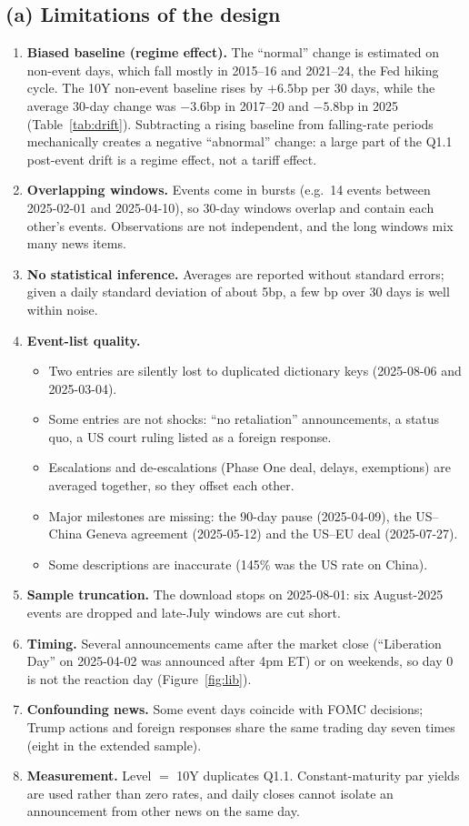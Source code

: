 \documentclass[11pt]{article}
\begin{document}
\subsection*{(a) Limitations of the design}
\begin{enumerate}[leftmargin=1.4em,itemsep=1pt]
\item \textbf{Biased baseline (regime effect).} The ``normal'' change is
estimated on non-event days, which fall mostly in 2015--16 and 2021--24, the
Fed hiking cycle. The 10Y non-event baseline rises by $+6.5$bp per 30 days,
while the average 30-day change was $-3.6$bp in 2017--20 and $-5.8$bp in 2025
(Table~\ref{tab:drift}). Subtracting a rising baseline from falling-rate
periods mechanically creates a negative ``abnormal'' change: a large part of
the Q1.1 post-event drift is a regime effect, not a tariff effect.
\item \textbf{Overlapping windows.} Events come in bursts (e.g.\ 14 events
between 2025-02-01 and 2025-04-10), so 30-day windows overlap and contain each
other's events. Observations are not independent, and the long windows mix
many news items.
\item \textbf{No statistical inference.} Averages are reported without
standard errors; given a daily standard deviation of about 5bp, a few bp over 30 days is
well within noise.
\item \textbf{Event-list quality.}
\begin{itemize}[nosep]
\item Two entries are silently lost to duplicated dictionary keys (2025-08-06
and 2025-03-04).
\item Some entries are not shocks: ``no retaliation'' announcements, a status
quo, a US court ruling listed as a foreign response.
\item Escalations and de-escalations (Phase One deal, delays, exemptions) are
averaged together, so they offset each other.
\item Major milestones are missing: the 90-day pause (2025-04-09), the US--China
Geneva agreement (2025-05-12) and the US--EU deal (2025-07-27).
\item Some descriptions are inaccurate (145\% was the US rate on China).
\end{itemize}
\item \textbf{Sample truncation.} The download stops on 2025-08-01: six
August-2025 events are dropped and late-July windows are cut short.
\item \textbf{Timing.} Several announcements came after the market close
(``Liberation Day'' on 2025-04-02 was announced after 4pm ET) or on weekends,
so day 0 is not the reaction day (Figure~\ref{fig:lib}).
\item \textbf{Confounding news.} Some event days coincide with FOMC decisions;
Trump actions and foreign responses share the same trading day seven times (eight in the extended sample).
\item \textbf{Measurement.} Level $=$ 10Y duplicates Q1.1. Constant-maturity
par yields are used rather than zero rates, and daily closes cannot isolate
an announcement from other news on the same day.
\end{enumerate}
\end{document}
